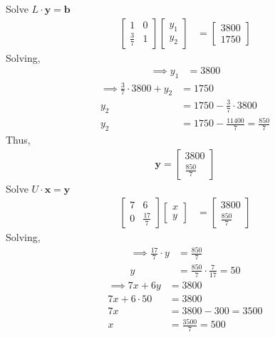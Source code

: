 \documentclass[journal]{IEEEtran}
\begin{document}
Solve \(L \cdot \mathbf{y} = \mathbf{b}\)
\begin{align}
\begin{bmatrix}
1 & 0 \\
\frac{3}{7} & 1
\end{bmatrix}
\begin{bmatrix}
y_1 \\
y_2
\end{bmatrix}
&=
\begin{bmatrix}
3800 \\
1750
\end{bmatrix}
\end{align}
Solving,\\
\begin{align}
\implies y_1 &= 3800
\end{align}
\begin{align}
\implies \frac{3}{7} \cdot 3800 + y_2 &= 1750 \\
y_2 &= 1750 - \frac{3}{7} \cdot 3800 \\
y_2 &= 1750 - \frac{11400}{7} = \frac{850}{7}
\end{align}
Thus,
\begin{align}
    \mathbf{y} = 
\begin{bmatrix}
3800 \\
\frac{850}{7}
\end{bmatrix}
\end{align}
Solve \(U \cdot \mathbf{x} = \mathbf{y}\)
\begin{align}
\begin{bmatrix}
7 & 6 \\
0 & \frac{17}{7}
\end{bmatrix}
\begin{bmatrix}
x \\
y
\end{bmatrix}
&=
\begin{bmatrix}
3800 \\
\frac{850}{7}
\end{bmatrix}
\end{align}
Solving,\\
\begin{align}
\implies \frac{17}{7} \cdot y &= \frac{850}{7} \\
y &={\frac{850}{7}} \cdot \frac{7}{17} = 50
\end{align}
\begin{align}
\implies 7x + 6y &= 3800 \\
7x + 6 \cdot 50 &= 3800 \\
7x &= 3800 - 300 = 3500 \\
x &= \frac{3500}{7} = 500
\end{align}
\end{document}
